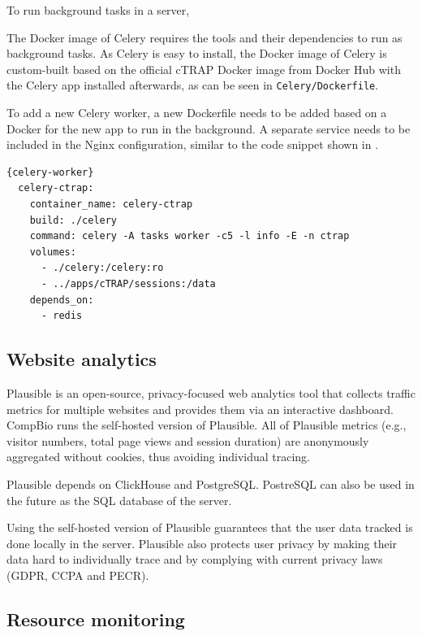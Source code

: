 To run background tasks in a server, 


The Docker image of Celery requires the tools and their dependencies to run as background tasks. As Celery is easy to install, the Docker image of Celery is custom-built based on the official cTRAP Docker image from Docker Hub with the Celery app installed afterwards, as can be seen in \texttt{Celery/Dockerfile}.

To add a new Celery worker, a new Dockerfile needs to be added based on a Docker for the new app to run in the background. A separate service needs to be included in the Nginx configuration, similar to the code snippet shown in .

\begin{lstlisting}[caption=Template for a new Celery worker.,language=XML,label={lst:celery-worker}]{celery-worker}
  celery-ctrap:
    container_name: celery-ctrap
    build: ./celery
    command: celery -A tasks worker -c5 -l info -E -n ctrap
    volumes:
      - ./celery:/celery:ro
      - ../apps/cTRAP/sessions:/data
    depends_on:
      - redis
\end{lstlisting}

\subsection{Website analytics}

Plausible is an open-source, privacy-focused web analytics tool that collects traffic metrics for multiple websites and provides them via an interactive dashboard. CompBio runs the self-hosted version of Plausible. All of Plausible metrics (e.g., visitor numbers, total page views and session duration) are anonymously aggregated without cookies, thus avoiding individual tracing.

Plausible depends on ClickHouse and PostgreSQL. PostreSQL can also be used in the future as the SQL database of the server.

Using the self-hosted version of Plausible guarantees that the user data tracked is done locally in the server. Plausible also protects user privacy by making their data hard to individually trace and by complying with current privacy laws (GDPR, CCPA and PECR).

\subsection{Resource monitoring}

